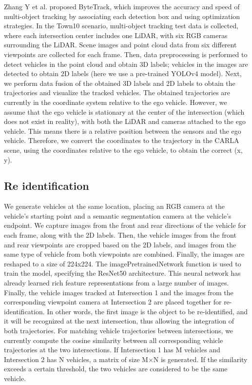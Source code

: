 Zhang Y et al. proposed ByteTrack, which improves the accuracy and speed of multi-object tracking by associating each detection box and using optimization strategies.\cite{Alpher22b}
In the Town10 scenario, multi-object tracking test data is collected, where each intersection center includes one LiDAR, with six RGB cameras surrounding the LiDAR. Scene images and point cloud data from six different viewpoints are collected for each frame.
Then, data preprocessing is performed to detect vehicles in the point cloud and obtain 3D labels; vehicles in the images are detected to obtain 2D labels (here we use a pre-trained YOLOv4 model).
Next, we perform data fusion of the obtained 3D labels and 2D labels to obtain the trajectories and visualize the tracked vehicles.
The obtained trajectories are currently in the coordinate system relative to the ego vehicle. However, we assume that the ego vehicle is stationary at the center of the intersection (which does not exist in reality), with both the LiDAR and cameras attached to the ego vehicle. This means there is a relative position between the sensors and the ego vehicle. Therefore, we convert the coordinates to the trajectory in the CARLA scene, using the coordinates relative to the ego vehicle, to obtain the correct (x, y).

\subsection{Re identification}

We generate vehicles at the same location, placing an RGB camera at the vehicle's starting point and a semantic segmentation camera at the vehicle's endpoint. We capture images from the front and rear directions of the vehicle for each frame, along with the 2D labels.
Then, the vehicle images from the front and rear viewpoints are cropped based on the 2D labels, and images from the same type of vehicle from both viewpoints are combined. Finally, the images are reshaped to a size of 224x224.
The imagePretrainedNetwork function is used to train the model, specifying the ResNet50 architecture. This neural network has already learned rich feature representations from a large number of images.
Finally, the vehicle images tracked at Intersection 1 and the images from the corresponding viewpoint camera at Intersection 2 are placed together for re-identification. In other words, the first image is the object to be re-identified, and it will be recognized at the next intersection, thus allowing the integration of both trajectories.
For matching vehicle trajectories between intersections, we currently compute the cosine similarity between all corresponding vehicle trajectories at the two intersections. If Intersection 1 has M vehicles and Intersection 2 has N vehicles, a matrix of size M×N is generated. If the similarity exceeds a certain threshold, the two vehicles are considered to be the same vehicle.

